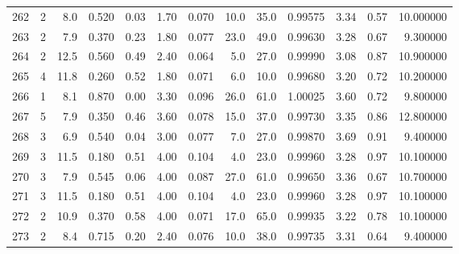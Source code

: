 \begin{tabular}{lrrrrrrrrrrrr}
262  &        2 &            8.0 &             0.520 &         0.03 &            1.70 &      0.070 &                 10.0 &                  35.0 &  0.99575 &  3.34 &       0.57 &  10.000000 \\
263  &        2 &            7.9 &             0.370 &         0.23 &            1.80 &      0.077 &                 23.0 &                  49.0 &  0.99630 &  3.28 &       0.67 &   9.300000 \\
264  &        2 &           12.5 &             0.560 &         0.49 &            2.40 &      0.064 &                  5.0 &                  27.0 &  0.99990 &  3.08 &       0.87 &  10.900000 \\
265  &        4 &           11.8 &             0.260 &         0.52 &            1.80 &      0.071 &                  6.0 &                  10.0 &  0.99680 &  3.20 &       0.72 &  10.200000 \\
266  &        1 &            8.1 &             0.870 &         0.00 &            3.30 &      0.096 &                 26.0 &                  61.0 &  1.00025 &  3.60 &       0.72 &   9.800000 \\
267  &        5 &            7.9 &             0.350 &         0.46 &            3.60 &      0.078 &                 15.0 &                  37.0 &  0.99730 &  3.35 &       0.86 &  12.800000 \\
268  &        3 &            6.9 &             0.540 &         0.04 &            3.00 &      0.077 &                  7.0 &                  27.0 &  0.99870 &  3.69 &       0.91 &   9.400000 \\
269  &        3 &           11.5 &             0.180 &         0.51 &            4.00 &      0.104 &                  4.0 &                  23.0 &  0.99960 &  3.28 &       0.97 &  10.100000 \\
270  &        3 &            7.9 &             0.545 &         0.06 &            4.00 &      0.087 &                 27.0 &                  61.0 &  0.99650 &  3.36 &       0.67 &  10.700000 \\
271  &        3 &           11.5 &             0.180 &         0.51 &            4.00 &      0.104 &                  4.0 &                  23.0 &  0.99960 &  3.28 &       0.97 &  10.100000 \\
272  &        2 &           10.9 &             0.370 &         0.58 &            4.00 &      0.071 &                 17.0 &                  65.0 &  0.99935 &  3.22 &       0.78 &  10.100000 \\
273  &        2 &            8.4 &             0.715 &         0.20 &            2.40 &      0.076 &                 10.0 &                  38.0 &  0.99735 &  3.31 &       0.64 &   9.400000 \\

\end{tabular}
